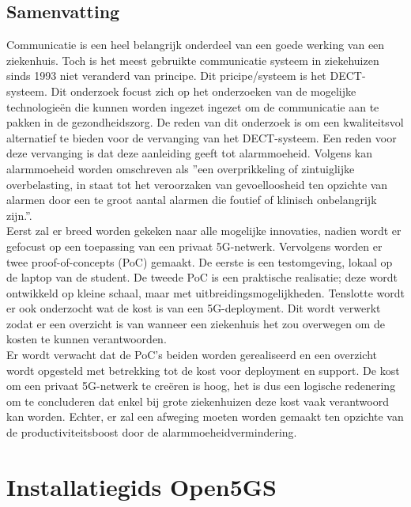 \documentclass[dutch,dit,thesis]{hogentreport}
\begin{document}
\section*{Samenvatting}
Communicatie is een heel belangrijk onderdeel van een goede werking van een ziekenhuis. Toch is het meest gebruikte communicatie systeem in ziekehuizen sinds 1993 niet veranderd van principe. Dit pricipe/systeem is het DECT-systeem. Dit onderzoek focust zich op het onderzoeken van de mogelijke technologieën die kunnen worden ingezet ingezet om de communicatie aan te pakken in de gezondheidszorg. De reden van dit onderzoek is om een kwaliteitsvol alternatief te bieden voor de vervanging van het DECT-systeem. Een reden voor deze vervanging is dat deze aanleiding geeft tot alarmmoeheid.
    Volgens \textcite{Ferrara2023} kan alarmmoeheid worden omschreven als ''een overprikkeling of zintuiglijke overbelasting, in staat tot het veroorzaken van gevoelloosheid ten opzichte van alarmen door een te groot aantal alarmen die foutief of klinisch onbelangrijk zijn.''.\\ Eerst zal er breed worden gekeken naar alle mogelijke innovaties, nadien wordt er gefocust op een toepassing van een privaat 5G-netwerk. 
    Vervolgens worden er twee proof-of-concepts (PoC) gemaakt. De eerste is een testomgeving, lokaal op de laptop van de student. De tweede PoC is een praktische realisatie; deze wordt ontwikkeld op kleine schaal, maar met uitbreidingsmogelijkheden. Tenslotte wordt er ook onderzocht wat de kost is van een 5G-deployment. Dit wordt verwerkt zodat er een overzicht is van wanneer een ziekenhuis het zou overwegen om de kosten te kunnen verantwoorden.\\
    Er wordt verwacht dat de PoC's beiden worden gerealiseerd en een overzicht wordt opgesteld met betrekking tot de kost voor deployment en support. De kost om een privaat 5G-netwerk te creëren is hoog, het is dus een logische redenering om te concluderen dat enkel bij grote ziekenhuizen deze kost vaak verantwoord kan worden. Echter, er zal een afweging moeten worden gemaakt ten opzichte van de productiviteitsboost door de alarmmoeheidvermindering.




%

\chapter{Installatiegids Open5GS}


% 


\backmatter{}

\setlength\bibitemsep{2pt} %
\printbibliography[heading=bibintoc]
\end{document}
